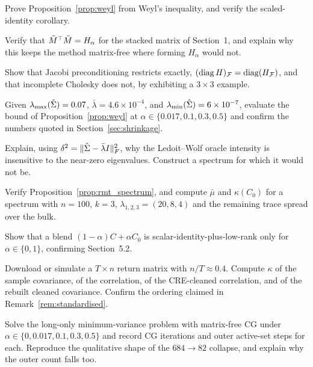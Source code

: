 \begin{exercises}

\begin{exercise}
Prove Proposition~\ref{prop:weyl} from Weyl's inequality, and verify the
scaled-identity corollary.
\end{exercise}

\begin{exercise}
Verify that $\tilde M^{\top}\tilde M = H_\alpha$ for the stacked matrix of Section~1, and
explain why this keeps the method matrix-free where forming $H_\alpha$ would not.
\end{exercise}

\begin{exercise}
Show that Jacobi preconditioning restricts exactly, $(\operatorname{diag} H)_{\mathcal{F}} = \operatorname{diag}(H_{\mathcal{F}})$,
and that incomplete Cholesky does not, by exhibiting a $3\times3$ example.
\end{exercise}

\begin{exercise}
Given $\lambda_{\max}(\hat{\Sigma}) = 0.07$, $\bar\lambda = 4.6\times10^{-4}$, and
$\lambda_{\min}(\hat{\Sigma}) = 6\times10^{-7}$, evaluate the bound of
Proposition~\ref{prop:weyl} at $\alpha \in \{0.017, 0.1, 0.3, 0.5\}$ and confirm the
numbers quoted in Section~\ref{sec:shrinkage}.
\end{exercise}

\begin{exercise}
Explain, using $\delta^2 = \lVert \hat{\Sigma} - \bar\lambda I \rVert_F^2$, why the Ledoit--Wolf
oracle intensity is insensitive to the near-zero eigenvalues. Construct a spectrum for
which it would not be.
\end{exercise}

\begin{exercise}
Verify Proposition~\ref{prop:rmt_spectrum}, and compute $\bar\mu$ and $\kappa(C_0)$ for
a spectrum with $n = 100$, $k = 3$, $\lambda_{1,2,3} = (20, 8, 4)$ and the remaining
trace spread over the bulk.
\end{exercise}

\begin{exercise}
Show that a blend $(1-\alpha)C + \alpha C_0$ is scalar-identity-plus-low-rank only for
$\alpha \in \{0,1\}$, confirming Section~5.2.
\end{exercise}

\begin{exercise}[Implementation]
Download or simulate a $T\times n$ return matrix with $n/T \approx 0.4$. Compute
$\kappa$ of the sample covariance, of the correlation, of the CRE-cleaned correlation,
and of the rebuilt cleaned covariance. Confirm the ordering claimed in
Remark~\ref{rem:standardised}.
\end{exercise}

\begin{exercise}[Implementation]
Solve the long-only minimum-variance problem with matrix-free CG under
$\alpha \in \{0, 0.017, 0.1, 0.3, 0.5\}$ and record CG iterations and outer active-set
steps for each. Reproduce the qualitative shape of the $684 \to 82$ collapse, and
explain why the outer count falls too.
\end{exercise}

\end{exercises}
